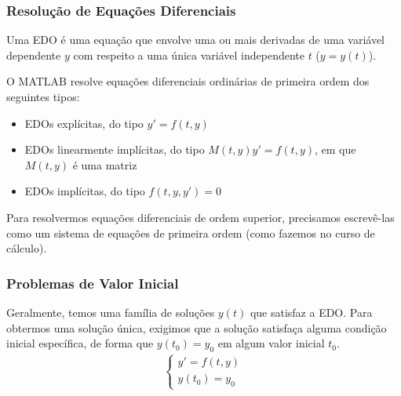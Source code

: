 \documentclass{beamer}
\begin{document}
\begin{frame}
  \frametitle{Resolução de Equações Diferenciais}
  Uma EDO é uma equação que envolve uma ou mais derivadas de uma variável dependente $y$ com respeito a uma única variável independente $t$ ($y = y(t)$).

  O MATLAB resolve equações diferenciais ordinárias de primeira ordem dos seguintes tipos:
  \begin{itemize}
  \item EDOs explícitas, do tipo $y' = f(t,y)$
  \item EDOs linearmente implícitas, do tipo $M(t,y)y' = f(t,y)$, em que $M(t,y)$ é uma matriz
  \item EDOs implícitas, do tipo $f(t,y,y') = 0$ %
  \end{itemize}

Para resolvermos equações diferenciais de ordem superior, precisamos escrevê-las como um sistema de equações de primeira ordem (como fazemos no curso de cálculo).
\end{frame}
\begin{frame}
  \frametitle{Problemas de Valor Inicial}
  Geralmente, temos uma família de soluções $y(t)$ que satisfaz a EDO. Para obtermos uma solução única, exigimos que a solução satisfaça alguma condição inicial específica, de forma que $y(t_0) = y_0$ em algum valor inicial $t_0$.
  \begin{align*}
    \begin{cases}
    y' = f(t,y)\\
    y(t_0) = y_0
    \end{cases}
  \end{align*}
\end{frame}
\end{document}
